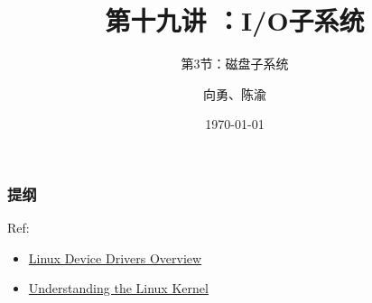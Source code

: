 


\title[第19讲]{第十九讲 ：I/O子系统} %
\subtitle{第3节：磁盘子系统}
\author{向勇、陈渝} %
\date{\today} %



\begin{frame}
\titlepage %
\end{frame}

\begin{frame}
\frametitle{提纲} %
\tableofcontents %

Ref:
    \begin{itemize}
        \item \href{http://osq.cs.berkeley.edu/public/JFoster-Drivers.ppt}{Linux Device Drivers Overview}
        \item \href{http://ermak.cs.nstu.ru/understanding.linux.kernel.pdf}{Understanding the Linux Kernel}
    \end{itemize}

\end{frame}
